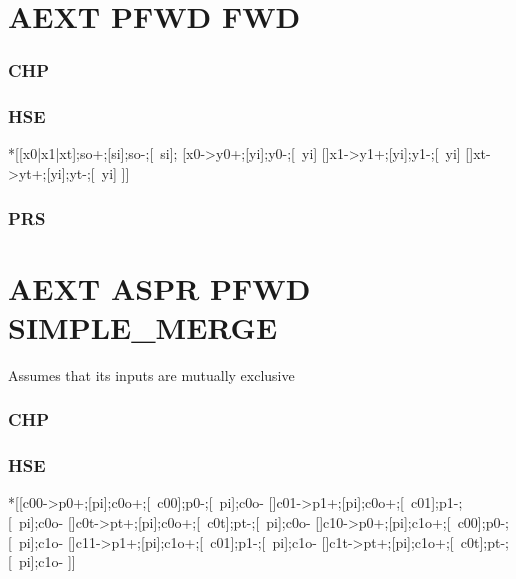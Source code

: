 \documentclass{article}
\begin{document}
\section{AEXT PFWD FWD}

\subsubsection*{CHP}

\subsubsection*{HSE}

\begin{hse}
*[[x0|x1|xt];so+;[si];so-;[~si];
  [x0->y0+;[yi];y0-;[~yi]
  []x1->y1+;[yi];y1-;[~yi]
  []xt->yt+;[yi];yt-;[~yi]
 ]]
\end{hse}

\subsubsection*{PRS}

\section{AEXT ASPR PFWD SIMPLE\_MERGE}

Assumes that its inputs are mutually exclusive

\subsubsection*{CHP}

\subsubsection*{HSE}

\begin{hse}
*[[c00->p0+;[pi];c0o+;[~c00];p0-;[~pi];c0o-
  []c01->p1+;[pi];c0o+;[~c01];p1-;[~pi];c0o-
  []c0t->pt+;[pi];c0o+;[~c0t];pt-;[~pi];c0o-
  []c10->p0+;[pi];c1o+;[~c00];p0-;[~pi];c1o-
  []c11->p1+;[pi];c1o+;[~c01];p1-;[~pi];c1o-
  []c1t->pt+;[pi];c1o+;[~c0t];pt-;[~pi];c1o-
 ]]
\end{hse}
\end{document}
